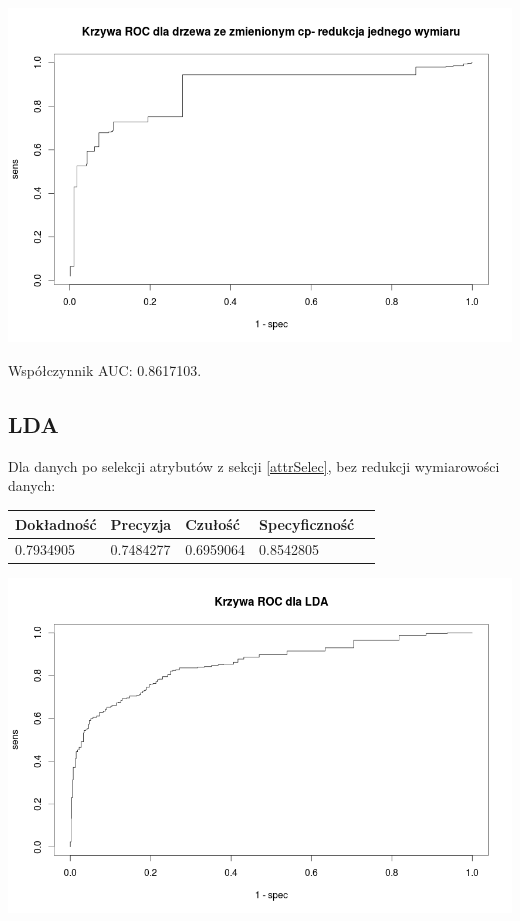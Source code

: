 \documentclass{article}
\begin{document}
\begin{center}
	\includegraphics[scale=0.40]{images/cptree2.png}
\end{center}

Współczynnik AUC: 0.8617103.

\subsection{LDA}

Dla danych po selekcji atrybutów z sekcji \ref{attrSelec}, bez redukcji wymiarowości danych:

\begin{center}
    \begin{tabular}{| l | l | l | l | l|}
    \hline
        Dokładność &  Precyzja &  Czułość & Specyficzność \\ \hline
      	0.7934905 & 0.7484277 & 0.6959064 & 0.8542805 \\
    \hline
    \end{tabular}
\end{center}

\begin{center}
	\includegraphics[scale=0.40]{images/ldaNoPCA.png}
\end{center}
\end{document}
